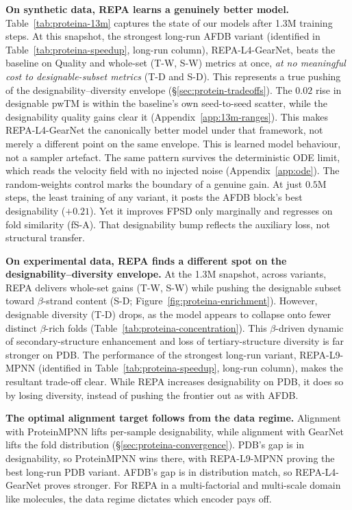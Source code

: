 \documentclass[12pt,a4paper,twoside]{report}
\begin{document}


\textbf{On synthetic data, REPA learns a genuinely better model.} Table~\ref{tab:proteina-13m} captures the state of our models after 1.3M training steps. At this snapshot, the strongest long-run AFDB variant (identified in Table~\ref{tab:proteina-speedup}, long-run column), REPA-L4-GearNet, beats the baseline on Quality and whole-set (T-W, S-W) metrics at once, \emph{at no meaningful cost to designable-subset metrics} (T-D and S-D). This represents a true pushing of the designability--diversity envelope (\S\ref{sec:protein-tradeoffs}). The $0.02$ rise in designable pwTM is within the baseline's own seed-to-seed scatter, while the designability quality gains clear it (Appendix~\ref{app:13m-ranges}). This makes REPA-L4-GearNet the canonically better model under that framework, not merely a different point on the same envelope. This is learned model behaviour, not a sampler artefact. The same pattern survives the deterministic ODE limit, which reads the velocity field with no injected noise (Appendix~\ref{app:ode}). The random-weights control marks the boundary of a genuine gain. At just $0.5$M steps, the least training of any variant, it posts the AFDB block's best designability ($+0.21$). Yet it improves FPSD only marginally and regresses on fold similarity (fS-A). That designability bump reflects the auxiliary loss, not structural transfer.

\textbf{On experimental data, REPA finds a different spot on the designability--diversity envelope.} At the 1.3M snapshot, across variants, REPA delivers whole-set gains (T-W, S-W) while pushing the designable subset toward $\beta$-strand content (S-D; Figure~\ref{fig:proteina-enrichment}). However, designable diversity (T-D) drops, as the model appears to collapse onto fewer distinct $\beta$-rich folds (Table~\ref{tab:proteina-concentration}). This $\beta$-driven dynamic of secondary-structure enhancement and loss of tertiary-structure diversity is far stronger on PDB. The performance of the strongest long-run variant, REPA-L9-MPNN (identified in Table~\ref{tab:proteina-speedup}, long-run column), makes the resultant trade-off clear. While REPA increases designability on PDB, it does so by losing diversity, instead of pushing the frontier out as with AFDB.





\textbf{The optimal alignment target follows from the data regime.} Alignment with ProteinMPNN lifts per-sample designability, while alignment with GearNet lifts the fold distribution (\S\ref{sec:proteina-convergence}). PDB's gap is in designability, so ProteinMPNN wins there, with REPA-L9-MPNN proving the best long-run PDB variant. AFDB's gap is in distribution match, so REPA-L4-GearNet proves stronger. For REPA in a multi-factorial and multi-scale domain like molecules, the data regime dictates which encoder pays off.
\end{document}
